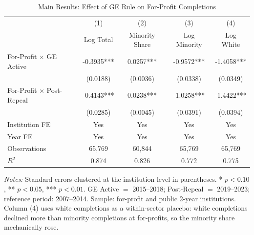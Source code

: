 \begin{table}[H]
\centering
\caption{Main Results: Effect of GE Rule on For-Profit Completions}
\label{tab:main}
\begin{threeparttable}
\begin{tabular}{lcccc}
\toprule
 & (1) & (2) & (3) & (4) \\
 & Log Total & Minority Share & Log Minority & Log White \\
\midrule
For-Profit $\times$ GE Active & -0.3935*** & 0.0257*** & -0.9572*** & -1.4058*** \\
 & (0.0188) & (0.0036) & (0.0338) & (0.0349) \\
[0.5em]
For-Profit $\times$ Post-Repeal & -0.4143*** & 0.0238*** & -1.0258*** & -1.4422*** \\
 & (0.0285) & (0.0045) & (0.0391) & (0.0394) \\
\midrule
Institution FE & Yes & Yes & Yes & Yes \\
Year FE & Yes & Yes & Yes & Yes \\
Observations & 65,769 & 60,844 & 65,769 & 65,769 \\
$R^2$ & 0.874 & 0.826 & 0.772 & 0.775 \\
\bottomrule
\end{tabular}
\begin{tablenotes}[flushleft]
\small
\item \textit{Notes:} Standard errors clustered at the institution level in parentheses. * $p<0.10$, ** $p<0.05$, *** $p<0.01$. GE Active $=$ 2015--2018; Post-Repeal $=$ 2019--2023; reference period: 2007--2014. Sample: for-profit and public 2-year institutions. Column (4) uses white completions as a within-sector placebo: white completions declined more than minority completions at for-profits, so the minority share mechanically rose.
\end{tablenotes}
\end{threeparttable}
\end{table}
